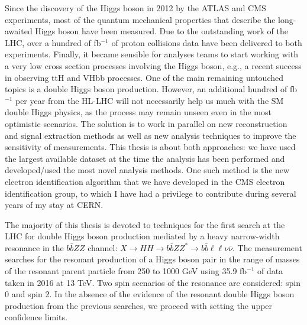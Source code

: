 Since the discovery of the Higgs boson in 2012 by the ATLAS and CMS experiments, most of the quantum mechanical properties that describe the long-awaited Higgs boson have been measured. Due to the outstanding work of the LHC, over a hundred of fb$^{-1}$ of proton collisions data have been delivered to both experiments. Finally, it became sensible for analyses teams to start working with a very low cross section processes involving the Higgs boson, e.g., a recent success in observing ttH and VHbb processes. One of the main remaining untouched topics is a double Higgs boson production. However, an additional hundred of fb$^{-1}$ per year from the HL-LHC will not necessarily help us much with the SM double Higgs physics, as the process may remain unseen even in the most optimistic scenarios. The solution is to work in parallel on new reconstruction and signal extraction methods as well as new analysis techniques to improve the sensitivity of measurements. This thesis is about both approaches: we have used the largest available dataset at the time the analysis has been performed and developed/used the most novel analysis methods. One such method is the new electron identification algorithm that we have developed in the CMS electron identification group, to which I have had a privilege to contribute during several years of my stay at CERN.

The majority of this thesis is devoted to techniques for the first search at the LHC for double Higgs boson production mediated by a heavy narrow-width resonance in the $b\bar{b}ZZ$ channel:  $X \to HH \to b\bar{b}ZZ^{*} \to b\bar{b} \ell\ell\nu \bar{\nu}$. The measurement searches for the resonant production of a Higgs boson pair in the range of masses of the resonant parent particle from 250 to 1000 GeV using 35.9 fb$^{-1}$ of data taken in 2016 at 13 TeV. Two spin scenarios of the resonance are considered: spin 0 and spin 2. In the absence of the evidence of the resonant double Higgs boson production from the previous searches, we proceed with setting the upper confidence limits. 